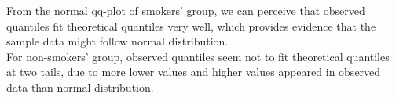 \documentclass[11pt,letterpaper]{article}
\begin{document}
\noindent From the normal qq-plot of smokers' group, we can perceive that observed quantiles fit theoretical quantiles very well, which provides evidence that the sample data might follow normal distribution. \\

\noindent For non-smokers' group, observed quantiles seem not to fit theoretical quantiles at two tails, due to more lower values and higher values appeared in observed data than normal distribution. 
\end{document}
